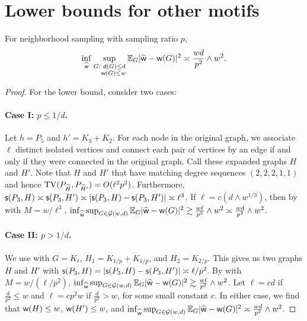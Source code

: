 \section{Lower bounds for other motifs}
\label{app:othermotif}

\begin{theorem}[Wedges] \label{thm:broken}
For neighborhood sampling with sampling ratio $ p $,
\begin{equation*}
\inf_{\widehat{{\mathsf{w}}}}\sup_{\substack{G: ~{\mathsf{d}}(G)\leq d\\ ~~~{\mathsf{w}}(G) \leq w}}\mathbb{E}_G|\widehat{{\mathsf{w}}}-{\mathsf{w}}(G)|^2\asymp \frac{wd}{p^2} \wedge w^2.
\end{equation*}
\end{theorem}

\begin{proof}
For the lower bound, consider two cases:

\paragraph{Case I: $ p \leq 1/d $.}
Let $ h = P_5 $ and $ h' = K_3 + K_2 $. For each node in the original graph, we associate $ \ell $ distinct isolated vertices and connect each pair of vertices by an edge if and only if they were connected in the original graph. Call these expanded graphs $ H $ and $ H' $. Note that $ H $ and $ H' $ that have matching degree sequences $(2,2,2,1,1)$ and hence $ {\rm TV}(P_{{\widetilde{H}}}, P_{{\widetilde{H}}'}) = O(\ell^2p^2) $. Furthermore, $ \mathsf{s}(P_3, H) \asymp \mathsf{s}(P_3, H') \asymp |\mathsf{s}(P_3, H) - \mathsf{s}(P_3, H')| \asymp \ell^3 $. If $ \ell = c( d \wedge w^{1/3}) $, then by  with $ M = w/\ell^3 $, $ \inf_{\widehat{{\mathsf{w}}}}\sup_{G\in{\mathcal{G}}(w, d) }\mathbb{E}_G|\widehat{{\mathsf{w}}}-{\mathsf{w}}(G)|^2 \gtrsim \frac{w\ell}{p^2} \wedge w^2 \asymp \frac{wd}{p^2} \wedge w^2 $.

\paragraph{Case II: $ p > 1/d $.}
We use  with $ G = K_{\ell} $, $ H_1 = K_{1/p} + K_{1/p} $, and $ H_2 = K_{2/p} $. This gives us two graphs $ H $ and $ H' $ with $ \mathsf{s}(P_3, H) = |\mathsf{s}(P_3, H) - \mathsf{s}(P_3, H')| \asymp \ell/p^2 $. 
 By  with $ M = w/(\ell/p^2) $, $ \inf_{\widehat{{\mathsf{w}}}}\sup_{G\in{\mathcal{G}}(w, d) }\mathbb{E}_G|\widehat{{\mathsf{w}}}-{\mathsf{w}}(G)|^2 \gtrsim \frac{w\ell}{p^2} \wedge w^2 $. Let $ \ell = cd $ if $ \frac{d}{p^2} \leq w $ and $ \ell = cp^2w $ if $ \frac{d}{p^2} > w $, for some small constant $ c $. In either case, we find that ${\mathsf{w}}(H) \leq w $, $ {\mathsf{w}}(H') \leq w $, and $ \inf_{\widehat{{\mathsf{w}}}}\sup_{G\in{\mathcal{G}}(w, d) }\mathbb{E}_G|\widehat{{\mathsf{w}}}-{\mathsf{w}}(G)|^2 \asymp \frac{wd}{p^2} \wedge w^2 $.
\end{proof}

